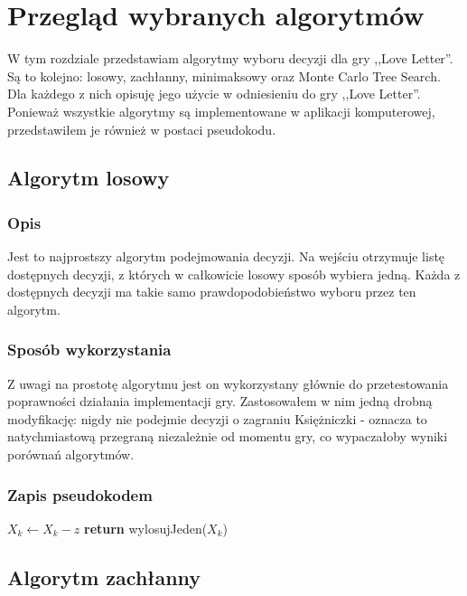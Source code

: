 \chapter{Przegląd wybranych algorytmów}
\label{cha:rozdz3}

W tym rozdziale przedstawiam algorytmy wyboru decyzji dla gry ,,Love Letter''. Są to kolejno: losowy, zachłanny, minimaksowy oraz Monte Carlo Tree Search. Dla każdego z nich opisuję jego użycie w odniesieniu do gry ,,Love Letter''. Ponieważ wszystkie algorytmy są implementowane w aplikacji komputerowej, przedstawiłem je również w postaci pseudokodu.

\section{Algorytm losowy}
\label{sec:algLos}
\subsection{Opis}
Jest to najprostszy algorytm podejmowania decyzji. Na wejściu otrzymuje listę dostępnych decyzji, z których w całkowicie losowy sposób wybiera jedną. Każda z dostępnych decyzji ma takie samo prawdopodobieństwo wyboru przez ten algorytm.

\subsection{Sposób wykorzystania}
Z uwagi na prostotę algorytmu jest on wykorzystany głównie do przetestowania poprawności działania implementacji gry. Zastosowałem w nim jedną drobną modyfikację: nigdy nie podejmie decyzji o zagraniu Księżniczki - oznacza to natychmiastową przegraną niezależnie od momentu gry, co wypaczałoby wyniki porównań algorytmów.

\subsection{Zapis pseudokodem}
\begin{algorithmic}[1]
				\State $X_k \gets X_k - z$
			\EndIf
		\EndFor
	\State \textbf{return} wylosujJeden($X_k$) 
	\EndFunction
\end{algorithmic}

\section{Algorytm zachłanny}
\label{sec:algZach}
